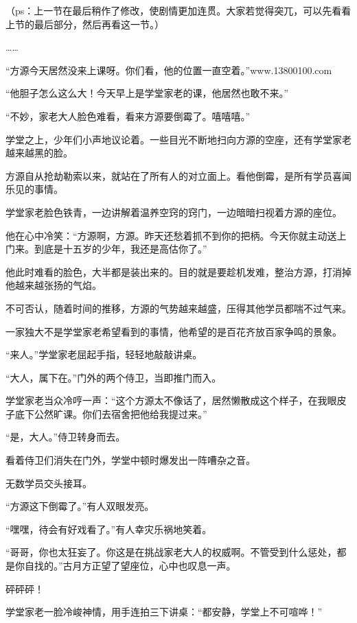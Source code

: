 
\begin{this_body}

（ps：上一节在最后稍作了修改，使剧情更加连贯。大家若觉得突兀，可以先看看上节的最后部分，然后再看这一节。）

……

“方源今天居然没来上课呀。你们看，他的位置一直空着。”www.13800100.com

“他胆子怎么这么大！今天早上是学堂家老的课，他居然也敢不来。”

“不妙，家老大人脸色难看，看来方源要倒霉了。嘻嘻嘻。”

学堂之上，少年们小声地议论着。一些目光不断地扫向方源的空座，还有学堂家老越来越黑的脸。

方源自从抢劫勒索以来，就站在了所有人的对立面上。看他倒霉，是所有学员喜闻乐见的事情。

学堂家老脸色铁青，一边讲解着温养空窍的窍门，一边暗暗扫视着方源的座位。

他在心中冷笑：“方源啊，方源。昨天还愁着抓不到你的把柄。今天你就主动送上门来。到底是十五岁的少年，我还是高估你了。”

他此时难看的脸色，大半都是装出来的。目的就是要趁机发难，整治方源，打消掉他越来越张扬的气焰。

不可否认，随着时间的推移，方源的气势越来越盛，压得其他学员都喘不过气来。

一家独大不是学堂家老希望看到的事情，他希望的是百花齐放百家争鸣的景象。

“来人。”学堂家老屈起手指，轻轻地敲敲讲桌。

“大人，属下在。”门外的两个侍卫，当即推门而入。

学堂家老当众冷哼一声：“这个方源太不像话了，居然懒散成这个样子，在我眼皮子底下公然旷课。你们去宿舍把他给我提过来。”

“是，大人。”侍卫转身而去。

看着侍卫们消失在门外，学堂中顿时爆发出一阵嘈杂之音。

无数学员交头接耳。

“方源这下倒霉了。”有人双眼发亮。

“嘿嘿，待会有好戏看了。”有人幸灾乐祸地笑着。

“哥哥，你也太狂妄了。你这是在挑战家老大人的权威啊。不管受到什么惩处，都是你自找的。”古月方正望了望座位，心中也叹息一声。

砰砰砰！

学堂家老一脸冷峻神情，用手连拍三下讲桌：“都安静，学堂上不可喧哗！”


\end{this_body}
